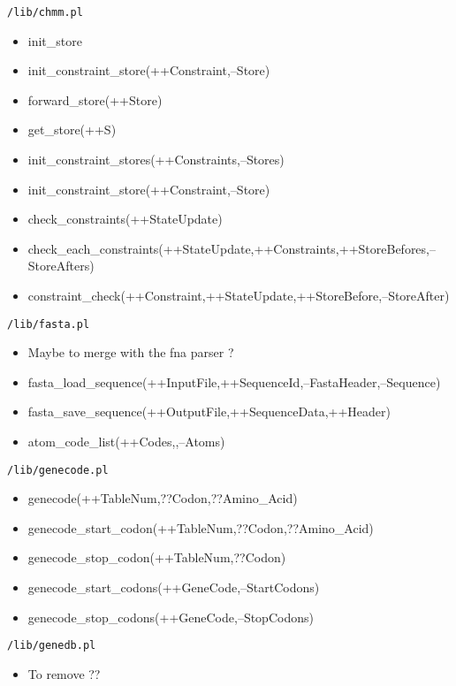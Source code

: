 \texttt{/lib/chmm.pl} \\
%
\begin{itemize}
\item init\_store
\item init\_constraint\_store(++Constraint,--Store)
\item forward\_store(++Store)
\item get\_store(++S)
\item init_constraint_stores(++Constraints,--Stores)
\item init_constraint_store(++Constraint,--Store)
\item check\_constraints(++StateUpdate)
\item check\_each\_constraints(++StateUpdate,++Constraints,++StoreBefores,--StoreAfters)
\item constraint\_check(++Constraint,++StateUpdate,++StoreBefore,--StoreAfter)
\end{itemize}


\texttt{/lib/fasta.pl}\\
%
\begin{itemize}
\item Maybe to merge with the fna parser ?
\item fasta\_load\_sequence(++InputFile,++SequenceId,--FastaHeader,--Sequence) 
\item fasta\_save\_sequence(++OutputFile,++SequenceData,++Header) 
\item atom\_code\_list(++Codes,,--Atoms)
\end{itemize}

\texttt{/lib/genecode.pl} \\
%
\begin{itemize}
\item genecode(++TableNum,??Codon,??Amino\_Acid)
\item genecode\_start\_codon(++TableNum,??Codon,??Amino\_Acid)
\item genecode\_stop\_codon(++TableNum,??Codon)
\item genecode\_start\_codons(++GeneCode,--StartCodons)
\item genecode\_stop\_codons(++GeneCode,--StopCodons)
\end{itemize}

\texttt{/lib/genedb.pl} \\
%
\begin{itemize}
\item To remove ??
\end{itemize}

